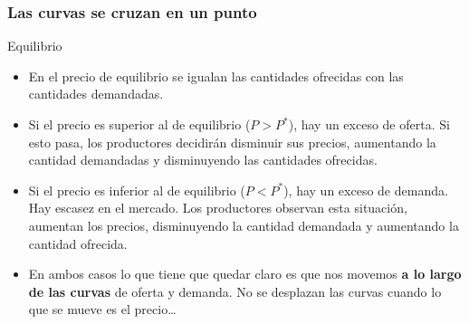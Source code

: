 \documentclass{beamer}
\begin{document}
\begin{frame}
\frametitle{Las curvas se cruzan en un punto}
    \begin{figure}[H]
    \begin{center}
    \end{center}
    \end{figure}
\end{frame}

\begin{frame}{Equilibrio}
    \begin{itemize}
        \item En el precio de equilibrio se igualan las cantidades ofrecidas con las cantidades demandadas.
        \item Si el precio es superior al de equilibrio ($P > P^*$), hay un exceso de oferta. Si esto pasa, los productores decidirán disminuir sus precios, aumentando la cantidad demandadas y disminuyendo las cantidades ofrecidas.
        \item Si el precio es inferior al de equilibrio ($P < P^*$), hay un exceso de demanda. Hay escasez en el mercado. Los productores observan esta situación, aumentan los precios, disminuyendo la cantidad demandada y aumentando la cantidad ofrecida.
        \item En ambos casos lo que tiene que quedar claro es que nos movemos \textbf{a lo largo de las curvas} de oferta y demanda. No se desplazan las curvas cuando lo que se mueve es el precio\dots
    \end{itemize}
\end{frame}
\end{document}
